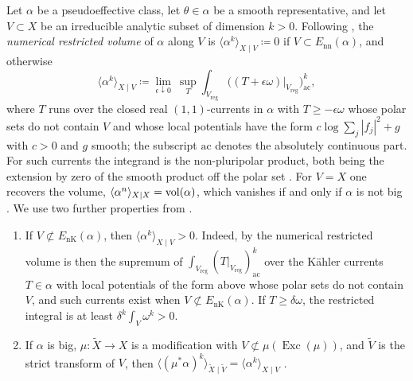 \documentclass[11pt,a4paper]{amsart}
\newcommand{\EnK}{E_{\mathrm{nK}}}
\newcommand{\Enn}{E_{\mathrm{nn}}}
\DeclareMathOperator{\Exc}{Exc}
\theoremstyle{definition}
\begin{document}
Let $\alpha$ be a pseudoeffective class, let $\theta\in\alpha$ be a
smooth representative, and let $V\subset X$ be an irreducible analytic
subset of dimension $k>0$. Following \cite[Section~2]{CT22}, the
\emph{numerical restricted volume} of $\alpha$ along $V$ is
$\langle\alpha^k\rangle_{X\mid V}\coloneqq 0$ if $V\subset\Enn(\alpha)$,
and otherwise
\[
  \langle\alpha^k\rangle_{X\mid V}
  \coloneqq \lim_{\epsilon\downarrow0}\ \sup_{T}
     \int_{V_{\mathrm{reg}}}
     \bigl((T+\epsilon\omega)|_{V_{\mathrm{reg}}}\bigr)_{\mathrm{ac}}^k,
\]
where $T$ runs over the closed real $(1,1)$-currents in $\alpha$ with
$T\ge-\epsilon\omega$ whose polar sets do not contain $V$ and whose local
potentials have the form $c\log\sum_j|f_j|^2+g$ with $c>0$ and $g$ smooth;
the subscript $\mathrm{ac}$ denotes the absolutely continuous part. For
such currents the integrand is the non-pluripolar product, both being the
extension by zero of the smooth product off the polar set
\cite[Remark~2.2]{CT22}. For $V=X$ one recovers the volume,
$\langle\alpha^n\rangle_{X\mid X}=\operatorname{vol}(\alpha)$, which vanishes if and
only if $\alpha$ is not big \cite{Bou02b}. We use two further properties
from \cite{CT22}.
\begin{enumerate}[label=(\alph*),leftmargin=*,itemsep=.2em,topsep=.3em]
\item\label{it:rv-positive} If $V\not\subset\EnK(\alpha)$, then
  $\langle\alpha^k\rangle_{X\mid V}>0$. Indeed, by
  \cite[Lemma~2.7]{CT22} the numerical restricted volume is then the
  supremum of
  $\int_{V_{\mathrm{reg}}}(T|_{V_{\mathrm{reg}}})_{\mathrm{ac}}^k$
  over the K\"ahler currents $T\in\alpha$ with local potentials of the
  form above whose polar sets do not contain $V$, and such currents exist
  when $V\not\subset\EnK(\alpha)$. If $T\ge\delta\omega$, the restricted
  integral is at least $\delta^k\int_V\omega^k>0$.
\item\label{it:rv-birational} If $\alpha$ is big,
  $\mu\colon\widetilde X\to X$ is a modification with
  $V\not\subset\mu(\Exc(\mu))$, and $\widetilde V$ is the strict transform
  of $V$, then $\langle(\mu^*\alpha)^k\rangle_{\widetilde X\mid\widetilde V}
  =\langle\alpha^k\rangle_{X\mid V}$ \cite[Lemma~4.2]{CT22}.
\end{enumerate}
\end{document}
